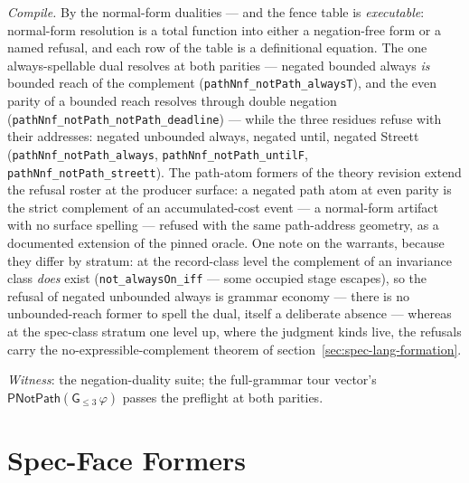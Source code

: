 \emph{Compile.} By the normal-form dualities --- and the fence table
is \emph{executable}: normal-form resolution is a total function
into either a negation-free form or a named refusal, and each row of
the table is a definitional equation. The one always-spellable dual
resolves at both parities --- negated bounded always \emph{is}
bounded reach of the complement
(\texttt{pathNnf\_notPath\_alwaysT}), and the even parity of a
bounded reach resolves through double negation
(\texttt{pathNnf\_notPath\_notPath\_deadline}) --- while the three
residues refuse with their addresses: negated unbounded always,
negated until, negated Streett (\texttt{pathNnf\_notPath\_always},
\texttt{pathNnf\_notPath\_untilF},
\texttt{pathNnf\_notPath\_streett}). The path-atom formers of the
theory revision extend the refusal roster at the producer surface: a
negated path atom at even parity is the strict complement of an
accumulated-cost event --- a normal-form artifact with no surface
spelling --- refused with the same path-address geometry, as a
documented extension of the pinned oracle. One note on the warrants,
because they differ by stratum: at the record-class level
the complement of an invariance class \emph{does} exist
(\texttt{not\_alwaysOn\_iff} --- some occupied stage escapes), so
the refusal of negated unbounded always is grammar economy --- there
is no unbounded-reach former to spell the dual, itself a deliberate
absence --- whereas at the spec-class stratum one level up, where
the judgment kinds live, the refusals carry the
no-expressible-complement theorem of
section~\ref{sec:spec-lang-formation}.

\emph{Witness}: the negation-duality suite; the full-grammar tour
vector's $\mathsf{PNotPath}(\mathsf{G}_{\le 3}\,\varphi)$ passes the
preflight at both parities.



\section{Spec-Face Formers}
\label{sec:spec-lang-faces}

